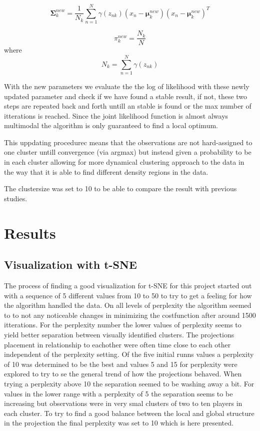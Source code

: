 \documentclass{article}
\begin{document}
$$\mathbf{\Sigma}_k^{new} = \frac{1}{N_k} \sum_{n=1}^N\gamma(z_{nk})(x_n-\mathbf{\mu}_k^{new})(x_n-\mathbf{\mu}_k^{new})^T$$

$$ \pi_k^{new}= \frac{N_k}{N} $$ 
where
$$  N_k = \sum_{n=1}^N \gamma(z_{nk})$$

With the new parameters we evaluate the the log of likelihood with these newly updated parameter and check if we have found a stable result, if not, these two steps are  repeated back and forth untill an stable is found or the max number of itterations is reached. Since the joint likelihood function is almost always multimodal the algorithm is only guaranteed to find a local optimum. 

This uppdating procedurec means that the observations are not hard-assigned to one cluster untill convergence (via argmax) but instead given a probability to be in each cluster allowing for more dynamical clustering approach to the data in the way that it is able to find different density regions in the data. 

The clustersize was set to 10 to be able to compare the result with previous studies.




\newpage

\section{Results}

\subsection{Visualization with t-SNE}

The process of finding a good visualization for t-SNE for this project started out with a sequence of 5 different values from 10 to 50 to try to get a feeling for how the algorithm handled the data. On all levels of perplexity the algorithm seemed to to not any noticeable changes in minimizing the costfunction after around 1500 itterations. For the perplexity number the lower values of perplexity seems to yield better separation between visually identified clusters. The projections placement in relationship to eachother were often time close to each other independent of the perplexity setting. Of the five initial runns values a perplexity of 10 was determined to be the best and values 5 and 15 for perplexity were explored to try to se the general trend of how the projections behaved. When trying a perplexity above 10 the separation seemed to be washing away a bit. For values in the lower range with a perplexity of 5 the separation seems to be increasing but observations were in very smal clusters of two to ten players in each cluster. To try to find a good balance between the local and global structure in the projection the final perplexity was set to 10 which is here presented. 
\end{document}
